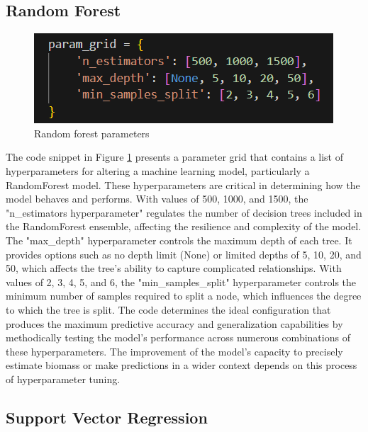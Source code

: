 \documentclass[a4paper,12pt]{report}%
\renewcommand{\\}{\vspace*{0.5\baselineskip} \newline}
\begin{document}
\subsection{Random Forest}

\begin{figure}[h]
\centering
	\includegraphics[scale=0.95]{images/rf param.png}\\
	\begin{footnotesize}
		\caption{Random forest parameters}
		\label{Random forest parameters}
	\end{footnotesize}
\end{figure}

\noindent The code snippet in Figure \ref{Random forest parameters} presents a parameter grid that contains a list of hyperparameters for altering a machine learning model, particularly a RandomForest model. These hyperparameters are critical in determining how the model behaves and performs. With values of 500, 1000, and 1500, the "n\_estimators hyperparameter" regulates the number of decision trees included in the RandomForest ensemble, affecting the resilience and complexity of the model.
The "max\_depth" hyperparameter controls the maximum depth of each tree. It provides options such as no depth limit (None) or limited depths of 5, 10, 20, and 50, which affects the tree's ability to capture complicated relationships. With values of 2, 3, 4, 5, and 6, the "min\_samples\_split" hyperparameter controls the minimum number of samples required to split a node, which influences the degree to which the tree is split. 
The code determines the ideal configuration that produces the maximum predictive accuracy and generalization capabilities by methodically testing the model's performance across numerous combinations of these hyperparameters. The improvement of the model's capacity to precisely estimate biomass or make predictions in a wider context depends on this process of hyperparameter tuning.

\subsection{Support Vector Regression}
\end{document}
